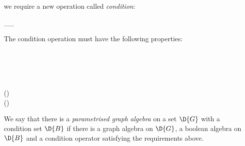 we require a new operation called \emph{condition}:


\begin{hscode}\SaveRestoreHook
{}%
%
\>[B]{}\D{[}\_\D{]}\_\;\mathbin{:}\;\;\;\;\;\<[E]%
\ColumnHook
\end{hscode}\resethooks

The condition operation must have the following properties:


\begin{hscode}\SaveRestoreHook
{}%
%
%
%
%
\>[3]{}\;\mathbin{:}\;\;\;\;\D{[}\D{]}\;\;\;\<[E]%
\\
\>[3]{}\;\mathbin{:}\;\;\;\;\D{[}\D{]}\;\;\;\D{\varepsilon}{}\<[E]%
\\
\>[3]{}\;\mathbin{:}\;\;\;\;\;\;\D{[}\;\;\D{]}\;\;\;\D{[}\D{]}\;\D{[}\D{]}\;{}\<[56]%
\>[56]{}\<[E]%
\\
\>[3]{}\;\mathbin{:}\;\;\;\;\;\;\D{[}\;\;\D{]}\;\;\;\D{[}\D{]}\;\;\D{+}\;\D{[}\D{]}\;{}\<[59]%
\>[59]{}\<[E]%
\\
\>[3]{}\;\mathbin{:}\;\;\;\;\;\;\D{[}\D{]}\;(\;\D{+}\;)\;\;\D{[}\D{]}\;\;\D{+}\;\D{[}\D{]}\;\<[E]%
\\
\>[3]{}\;\mathbin{:}\;\;\;\;\;\;\D{[}\D{]}\;(\;\D{\seq}\;)\;\;\D{[}\D{]}\;\;\D{\seq}\;\D{[}\D{]}\;\<[E]%
\ColumnHook
\end{hscode}\resethooks

We say that there is a \emph{parametrised graph algebra} on a set \ensuremath{\D{G}} with a condition set \ensuremath{\D{B}}
if there is a graph algebra on \ensuremath{\D{G}}, a boolean algebra on \ensuremath{\D{B}} and a condition operator satisfying the requirements above.

